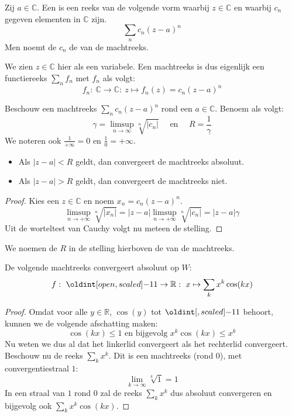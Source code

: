 \documentclass[main.tex]{subfiles}
\begin{document}
\begin{de}
  Zij $a \in \mathbb{C}$.
  Een  is een reeks van de volgende vorm waarbij $z\in\mathbb{C}$ en waarbij $c_{n}$ gegeven elementen in $\mathbb{C}$ zijn.
  \[ \sum_{n}c_{n}(z-a)^{n} \]
  Men noemt de $c_{n}$ de  van de machtreeks.
\end{de}

\begin{opm}
  We zien $z \in \mathbb{C}$ hier als een variabele.
  Een machtreeks is dus eigenlijk een functiereeks $\sum_{n}f_{n}$ met $f_{n}$ als volgt:
  \[ f_{n}:\ \mathbb{C} \rightarrow \mathbb{C}:\ z \mapsto f_{n}(z) = c_{n}(z-a)^{n} \]
\end{opm}

\begin{bst}
  \label{st:worteltest}
  Beschouw een machtreeks $\sum_{n}c_{n}(z-a)^{n}$ rond een $a\in \mathbb{C}$.
  Benoem als volgt:
  \[ \gamma = \limsup_{n \rightarrow \infty}\sqrt[n]{|c_{n}|} \quad\text{ en }\quad R = \frac{1}{\gamma} \]
  We noteren ook $\frac{1}{+\infty}=0$ en $\frac{1}{0} = +\infty$.
  \begin{itemize}
  \item Als $|z-a| < R$ geldt, dan convergeert de machtreeks absoluut.
  \item Als $|z-a| > R$ geldt, dan convergeert de machtreeks niet.
  \end{itemize}

  \begin{proof}
    Kies een $z\in \mathbb{C}$ en noem $x_{n}=c_{n}(z-a)^{n}$.
    \[ \limsup_{n\rightarrow +\infty}\sqrt[n]{|x_{n}|} = |z-a|\limsup_{n\rightarrow +\infty}\sqrt[n]{|c_{n}|} = |z-a|\gamma \]
    Uit de worteltest van Cauchy volgt nu meteen de stelling.
  \end{proof}
\end{bst}


\begin{de}
  We noemen de $R$ in de stelling hierboven de  van de machtreeks.
\end{de}

\begin{vb}
  De volgende machtreeks convergeert absoluut op $W$:
  \[ f:\ \interval[open]{-1}{1} \rightarrow \mathbb{R}:\ x \mapsto \sum_{k}x^{k}\cos(kx) \]
  
  \begin{proof}
    Omdat voor alle $y\in \mathbb{R}$, $\cos(y)$ tot $\interval{-1}{1}$ behoort, kunnen we de volgende afschatting maken:
    \[ \cos(kx) \le 1  \text{ en bijgevolg } x^{k}\cos(kx) \le x^{k} \]
    Nu weten we dus al dat het linkerlid convergeert als het rechterlid convergeert.
    Beschouw nu de reeks $\sum_{k}x^{k}$.
    Dit is een machtreeks (rond $0$), met convergentiestraal $1$:
    \[ \lim_{k\rightarrow \infty}\sqrt[k]{1} = 1 \]
    In een straal van $1$ rond $0$ zal de reeks $\sum_{k}x^{k}$ dus absoluut convergeren en bijgevolg ook $\sum_{k}x^{k}\cos(kx)$.
  \end{proof}
\end{vb}
\end{document}
